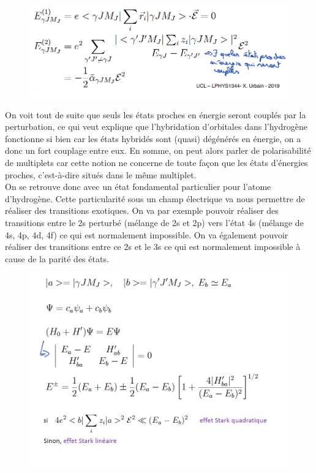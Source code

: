 \begin{figure}[tph]
    \centering
    \includegraphics[scale=0.8]{Images2/correcordre.PNG}
\end{figure}

On voit tout de suite que seuls les états proches en énergie seront couplés par la perturbation, ce qui veut explique que l'hybridation d'orbitales dans l'hydrogène fonctionne si bien car les états hybridés sont (quasi) dégénérés en énergie, on a donc un fort couplage entre eux. En somme, on peut alors parler de polarisabilité de multiplets car cette notion ne concerne de toute façon que les états d'énergies proches, c'est-à-dire situés dans le même multiplet.\\

On se retrouve donc avec un état fondamental particulier pour l'atome d'hydrogène. Cette particularité sous un champ électrique va nous permettre de réaliser des transitions exotiques. On va par exemple pouvoir réaliser des transitions entre le 2s perturbé (mélange de 2s et 2p) vers l'état 4s (mélange de 4s, 4p, 4d, 4f) ce qui est normalement impossible. On va également pouvoir réaliser des transitions entre ce 2s et le 3s ce qui est normalement impossible à cause de la parité des états.\\

\begin{figure}[tph]
    \centering
    \includegraphics[scale=0.7]{Images2/EffetStark.PNG}
\end{figure}

